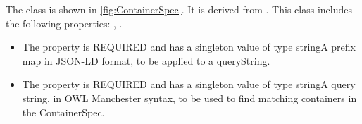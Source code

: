 %
The  class is shown in \ref{fig:ContainerSpec}. It is derived from .%
This class includes the following properties: , . %
\begin{itemize}%
\item%
The  property is REQUIRED and has a singleton value of type stringA prefix map in JSON-LD format, to be applied to a queryString.%
\item%
The  property is REQUIRED and has a singleton value of type stringA query string, in OWL Manchester syntax, to be used to find matching containers in the ContainerSpec.%
\end{itemize}%
